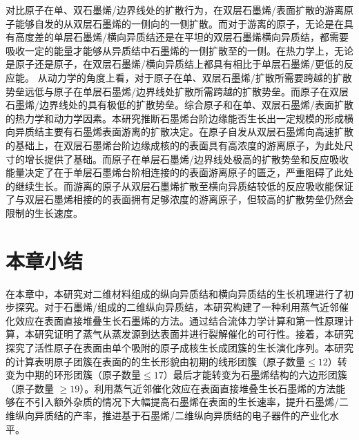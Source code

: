     对比原子在单、双石墨烯/边界线处的扩散行为，在双层石墨烯/表面扩散的游离原子能够自发的从双层石墨烯的一侧向的一侧扩散。而对于游离的原子，无论是在具有高度差的单层石墨烯/横向异质结还是在平坦的双层石墨烯横向异质结，都需要吸收一定的能量才能够从异质结中石墨烯的一侧扩散至的一侧。在热力学上，无论是原子还是原子，在双层石墨烯/横向异质结上都具有相比于单层石墨烯/更低的反应能。
    从动力学的角度上看，对于原子在单、双层石墨烯/扩散所需要跨越的扩散势垒远低与原子在单层石墨烯/边界线处扩散所需跨越的扩散势垒。而原子在双层石墨烯/边界线处的具有极低的扩散势垒。综合原子和在单、双层石墨烯/表面扩散的热力学和动力学因素。本研究推断石墨烯台阶边缘能否生长出一定规模的形成横向异质结主要有石墨烯表面游离的扩散决定。在原子自发从双层石墨烯向高速扩散的基础上，在双层石墨烯台阶边缘成核的的表面具有高浓度的游离原子，为此处尺寸的增长提供了基础。而原子在单层石墨烯/边界线处极高的扩散势垒和反应吸收能量决定了在于单层石墨烯台阶相连接的的表面游离原子的匮乏，严重阻碍了此处的继续生长。而游离的原子从双层石墨烯扩散至横向异质结较低的反应吸收能保证了与双层石墨烯相接的的表面拥有足够浓度的游离原子，但较高的扩散势垒仍然会限制的生长速度。
    
\section{本章小结}
    在本章中，本研究对二维材料组成的纵向异质结和横向异质结的生长机理进行了初步探究。对于石墨烯/组成的二维纵向异质结，本研究构建了一种利用蒸气近邻催化效应在表面直接堆叠生长石墨烯的方法。通过结合流体力学计算和第一性原理计算，本研究证明了蒸气从蒸发源到达表面并进行裂解催化的可行性。接着，本研究探究了活性原子在表面由单个吸附的原子成核生长成团簇的生长演化序列。本研究的计算表明原子团簇在表面的的生长形貌由初期的线形团簇（原子数量$\leqslant 12$）转变为中期的环形团簇（原子数量$\leqslant 17$）最后才能转变为石墨烯结构的六边形团簇（原子数量 $\geqslant 19$）。利用蒸气近邻催化效应在表面直接堆叠生长石墨烯的方法能够在不引入额外杂质的情况下大幅提高石墨烯在表面的生长速率，提升石墨烯/二维纵向异质结的产率，推进基于石墨烯/二维纵向异质结的电子器件的产业化水平。

